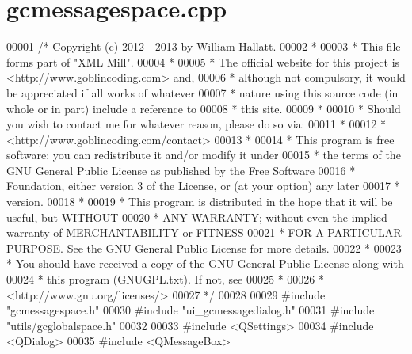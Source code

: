 \hypertarget{gcmessagespace_8cpp_source}{\section{gcmessagespace.\-cpp}
}

\begin{DoxyCode}
00001 \textcolor{comment}{/* Copyright (c) 2012 - 2013 by William Hallatt.}
00002 \textcolor{comment}{ *}
00003 \textcolor{comment}{ * This file forms part of "XML Mill".}
00004 \textcolor{comment}{ *}
00005 \textcolor{comment}{ * The official website for this project is <http://www.goblincoding.com> and,}
00006 \textcolor{comment}{ * although not compulsory, it would be appreciated if all works of whatever}
00007 \textcolor{comment}{ * nature using this source code (in whole or in part) include a reference to}
00008 \textcolor{comment}{ * this site.}
00009 \textcolor{comment}{ *}
00010 \textcolor{comment}{ * Should you wish to contact me for whatever reason, please do so via:}
00011 \textcolor{comment}{ *}
00012 \textcolor{comment}{ *                 <http://www.goblincoding.com/contact>}
00013 \textcolor{comment}{ *}
00014 \textcolor{comment}{ * This program is free software: you can redistribute it and/or modify it
       under}
00015 \textcolor{comment}{ * the terms of the GNU General Public License as published by the Free
       Software}
00016 \textcolor{comment}{ * Foundation, either version 3 of the License, or (at your option) any later}
00017 \textcolor{comment}{ * version.}
00018 \textcolor{comment}{ *}
00019 \textcolor{comment}{ * This program is distributed in the hope that it will be useful, but WITHOUT}
00020 \textcolor{comment}{ * ANY WARRANTY; without even the implied warranty of MERCHANTABILITY or
       FITNESS}
00021 \textcolor{comment}{ * FOR A PARTICULAR PURPOSE.  See the GNU General Public License for more
       details.}
00022 \textcolor{comment}{ *}
00023 \textcolor{comment}{ * You should have received a copy of the GNU General Public License along with}
00024 \textcolor{comment}{ * this program (GNUGPL.txt).  If not, see}
00025 \textcolor{comment}{ *}
00026 \textcolor{comment}{ *                    <http://www.gnu.org/licenses/>}
00027 \textcolor{comment}{ */}
00028 
00029 \textcolor{preprocessor}{#include "gcmessagespace.h"}
00030 \textcolor{preprocessor}{#include "ui\_gcmessagedialog.h"}
00031 \textcolor{preprocessor}{#include "utils/gcglobalspace.h"}
00032 
00033 \textcolor{preprocessor}{#include <QSettings>}
00034 \textcolor{preprocessor}{#include <QDialog>}
00035 \textcolor{preprocessor}{#include <QMessageBox>}

\end{DoxyCode}
